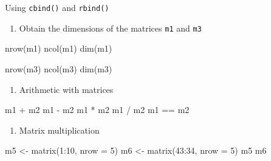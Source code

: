 \documentclass[
  letterpaper,
  DIV=11,
  numbers=noendperiod]{scrreprt}
\newenvironment{Shaded}{}{}
\newcommand{\AttributeTok}[1]{\textcolor[rgb]{0.84,0.23,0.29}{#1}}
\newcommand{\DecValTok}[1]{\textcolor[rgb]{0.00,0.36,0.77}{#1}}
\newcommand{\FunctionTok}[1]{\textcolor[rgb]{0.44,0.26,0.76}{#1}}
\newcommand{\NormalTok}[1]{\textcolor[rgb]{0.14,0.16,0.18}{#1}}
\newcommand{\OtherTok}[1]{\textcolor[rgb]{0.44,0.26,0.76}{#1}}
\newcommand{\SpecialCharTok}[1]{\textcolor[rgb]{0.00,0.36,0.77}{#1}}
\providecommand{\tightlist}{%
  \setlength{\itemsep}{0pt}\setlength{\parskip}{0pt}}\usepackage{longtable,booktabs,array}
\begin{document}
Using \texttt{cbind()} and \texttt{rbind()}

\begin{enumerate}
\def\labelenumi{\alph{enumi}.}
\setcounter{enumi}{1}
\tightlist
\item
  Obtain the dimensions of the matrices \texttt{m1} and \texttt{m3}
\end{enumerate}

\begin{Shaded}
\begin{Highlighting}[]
\FunctionTok{nrow}\NormalTok{(m1)}
\FunctionTok{ncol}\NormalTok{(m1)}
\FunctionTok{dim}\NormalTok{(m1)}
\end{Highlighting}
\end{Shaded}

\begin{Shaded}
\begin{Highlighting}[]
\FunctionTok{nrow}\NormalTok{(m3)}
\FunctionTok{ncol}\NormalTok{(m3)}
\FunctionTok{dim}\NormalTok{(m3)}
\end{Highlighting}
\end{Shaded}

\begin{enumerate}
\def\labelenumi{\alph{enumi}.}
\setcounter{enumi}{2}
\tightlist
\item
  Arithmetic with matrices
\end{enumerate}

\begin{Shaded}
\begin{Highlighting}[]
\NormalTok{m1 }\SpecialCharTok{+}\NormalTok{ m2}
\NormalTok{m1 }\SpecialCharTok{{-}}\NormalTok{ m2}
\NormalTok{m1 }\SpecialCharTok{*}\NormalTok{ m2}
\NormalTok{m1 }\SpecialCharTok{/}\NormalTok{ m2}
\NormalTok{m1 }\SpecialCharTok{==}\NormalTok{ m2}
\end{Highlighting}
\end{Shaded}

\begin{enumerate}
\def\labelenumi{\alph{enumi}.}
\setcounter{enumi}{3}
\tightlist
\item
  Matrix multiplication
\end{enumerate}

\begin{Shaded}
\begin{Highlighting}[]
\NormalTok{m5 }\OtherTok{\textless{}{-}} \FunctionTok{matrix}\NormalTok{(}\DecValTok{1}\SpecialCharTok{:}\DecValTok{10}\NormalTok{, }\AttributeTok{nrow =} \DecValTok{5}\NormalTok{)}
\NormalTok{m6 }\OtherTok{\textless{}{-}} \FunctionTok{matrix}\NormalTok{(}\DecValTok{43}\SpecialCharTok{:}\DecValTok{34}\NormalTok{, }\AttributeTok{nrow =} \DecValTok{5}\NormalTok{)}
\NormalTok{m5}
\NormalTok{m6}
\end{Highlighting}
\end{Shaded}
\end{document}
